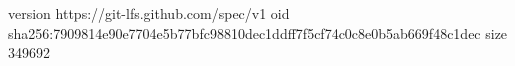 version https://git-lfs.github.com/spec/v1
oid sha256:7909814e90e7704e5b77bfc98810dec1ddff7f5cf74c0c8e0b5ab669f48c1dec
size 349692
